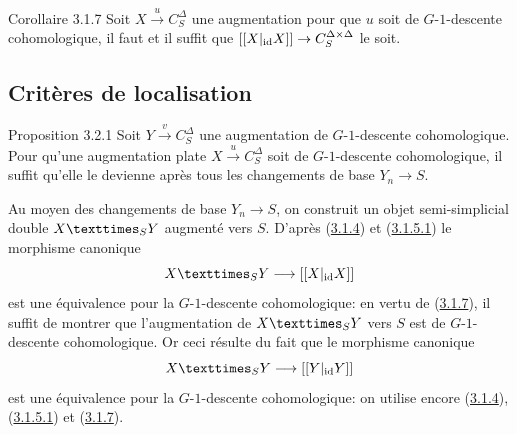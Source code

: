 \documentclass[10pt]{../fichiers-configuration-latex/smfart}
\begin{document}
\begin{enonce*}{Corollaire 3.1.7}
Soit $X \xrightarrow{u} C^{\Delta}_S$ une augmentation pour que $u$
soit de $G$-$1$-descente cohomologique, il faut et il suffit que $[[X
    |_{\id} X]] \to C^{\Delta \times \Delta}_S$ le soit.
\end{enonce*}

\subsection{Critères de localisation}\pageoriginale

\begin{enonce*}{Proposition 3.2.1}
Soit $Y \xrightarrow{v} C^{\Delta}_S$ une
augmentation de $G$-$1$-descente cohomologique. Pour qu'une augmentation
plate $X \xrightarrow{u} C^{\Delta}_S$ soit de $G$-$1$-descente
cohomologique, il suffit qu'elle le devienne après tous les
changements de base $Y_n \to S$.
\end{enonce*}

Au moyen des changements de base $Y_n \to S$, on construit un objet
semi-simplicial double $\fprod{X}{Y}{S}$ augmenté
vers $S$. D'après (\hyperref[Vbis.prop3.1.4]{3.1.4}) et (\hyperref[Vbis.lem3.1.5.1]{3.1.5.1}) le morphisme canonique
$$\fprod{X}{Y}{S}\to[[X|_{\id}X]]$$ est une
équivalence pour la $G$-$1$-descente cohomologique: en vertu de (\hyperref[Vbis.cor3.1.7]{3.1.7}),
il suffit de montrer que l'augmentation de $\fprod{X}{Y}{S}$ vers $S$
est de $G$-$1$-descente cohomologique. Or ceci résulte du fait que le
morphisme canonique $$\fprod{X}{Y}{S} \to [[Y|_{\id} Y]]$$ est une
équivalence pour la $G$-$1$-descente cohomologique: on utilise encore
(\hyperref[Vbis.prop3.1.4]{3.1.4}), (\hyperref[Vbis.lem3.1.5.1]{3.1.5.1}) et (\hyperref[Vbis.cor3.1.7]{3.1.7}).

\setcounter{subsubsection}{1}
\end{document}
